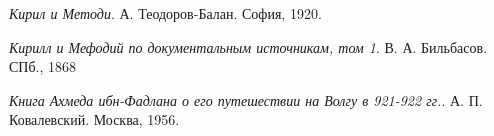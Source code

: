 \emph{Кирил и Методи}. А. Теодоров-Балан. София, 1920.

\emph{Кирилл и Мефодий по документальным источникам, том 1}. В. А. Бильбасов. СПб., 1868 

\emph{Книга Ахмеда ибн-Фадлана о его путешествии на Волгу в 921-922 гг.}. А. П. Ковалевский. Москва, 1956.


